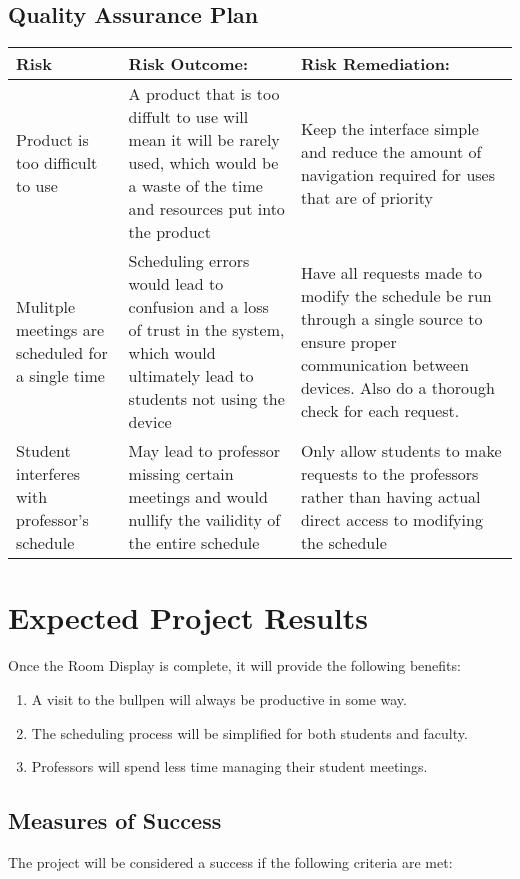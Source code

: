 \documentclass[12pt]{article}
\begin{document}
\subsection{Quality Assurance Plan}
\begin{center}
\begin{tabular}{|p{4cm}|p{6cm}|p{6cm}|}
\hline
\textbf{Risk} & \textbf{Risk Outcome:} & \textbf{Risk Remediation:} \\
\hline
Product is too difficult to use & A product that is too diffult to use will mean it will be rarely used, which would be a waste of the time and resources put into the product & Keep the interface simple and reduce the amount of navigation required for uses that are of priority\\
\hline
Mulitple meetings are scheduled for a single time & Scheduling errors would lead to confusion and a loss of trust in the system, which would ultimately lead to students not using the device & Have all requests made to modify the schedule be run through a single source to ensure proper communication between devices. Also do a thorough check for each request.\\
\hline
Student interferes with professor's schedule & May lead to professor missing certain meetings and would nullify the vailidity of the entire schedule & Only allow students to make requests to the professors rather than having actual direct access to modifying the schedule\\
\hline

\end{tabular}
\end{center}

\section{Expected Project Results}
Once the Room Display is complete, it will provide the following benefits:

\begin{enumerate}
\item A visit to the bullpen will always be productive in some way.
\item The scheduling process will be simplified for both students and faculty.
\item Professors will spend less time managing their student meetings.
\end{enumerate}

\subsection{Measures of Success}
The project will be considered a success if the following criteria are met: 
\end{document}

